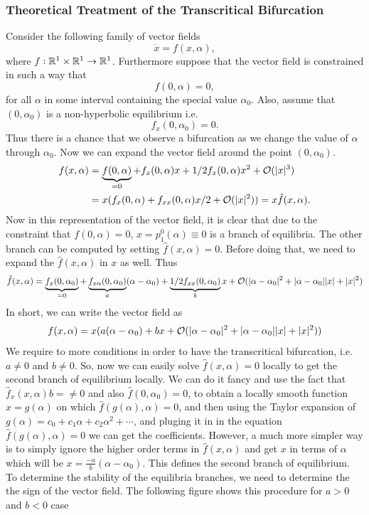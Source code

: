 \subsubsection*{Theoretical Treatment of the Transcritical Bifurcation}
Consider the following family of vector fields
\[  \dot{x} = f(x,\alpha), \]
where $f:\mathbb{R}^1 \times \mathbb{R}^1 \to \mathbb{R}^1$. Furthermore suppose that the vector field is constrained in such a way that 
\[ f(0,\alpha) = 0, \]
for all $\alpha$ in some interval containing the special value $\alpha_0$. Also, assume that $(0,\alpha_0)$ is a non-hyperbolic equilibrium i.e.
\[ f_x(0,\alpha_0) = 0. \]
Thus there is a chance that we observe a bifurcation as we change the value of $\alpha$ through $\alpha_0$. Now we can expand the vector field around the point $(0,\alpha_0)$. 
\begin{align*}
	f(x,\alpha) &= \underbrace{f(0,\alpha)}_{=0} + f_x(0,\alpha)x + 1/2 f_x(0,\alpha) x^2 + \mathcal{O}(|x|^3) \\
	&= x(f_x(0,\alpha) + f_{xx}(0,\alpha)x/2 + \mathcal{O}(|x|^2))= x\hat{f}(x,\alpha).
\end{align*}
Now in this representation of the vector field, it is clear that due to the constraint that $f(0,\alpha)=0$, $x=p^0_1(\alpha)\equiv0$ is a branch of equilibria. The other branch can be computed by setting $\hat{f}(x,\alpha)=0$. Before doing that, we need to expand the $\hat{f}(x,\alpha)$ in $x$ as well. Thus
\[ \hat{f}(x,\alpha) = \underbrace{f_x(0,\alpha_0)}_{=0} + \underbrace{f_{x\alpha}(0,\alpha_0)}_{a}(\alpha-\alpha_0)
						+ \underbrace{1/2f_{xx}(0,\alpha_0)}_{b} x 
						+ \mathcal{O}(|\alpha-\alpha_0|^2 + |\alpha-\alpha_0||x| + |x|^2)  \]
In short, we can write the vector field as
\[ f(x,\alpha) = x (a(\alpha-\alpha_0) + bx + \mathcal{O}(|\alpha-\alpha_0|^2 + |\alpha-\alpha_0||x| + |x|^2)  ) \]
We require to more conditions in order to have the transcritical bifurcation, i.e. $a\neq0$ and $b\neq0$.  So, now we can easily solve $\hat{f}(x,\alpha)=0$ locally to get the second branch of equilibrium locally. We can do it fancy and use the fact that $\hat{f}_x(x,\alpha)  b = \neq 0$ and also $\hat{f}(0,\alpha_0) = 0$, to obtain a locally smooth function $x = g(\alpha)$ on which $\hat{f}(g(\alpha),\alpha) = 0$, and then using the Taylor expansion of $g(\alpha) = c_0 + c_1\alpha + c_2\alpha^2+\cdots$, and pluging it in in the equation $\hat{f}(g(\alpha),\alpha) = 0$ we can get the coefficients. However, a much more simpler way is to simply ignore the higher order terms in $\hat{f}(x,\alpha)$ and get $x$ in terms of $\alpha$ which will be $x = \frac{-a}{b}(\alpha-\alpha_0)$. This defines the second branch of equilibrium. To determine the stability of the equilibria branches, we need to determine the the sign of the vector field. The following figure shows this procedure for $a>0$ and $b<0$ case


